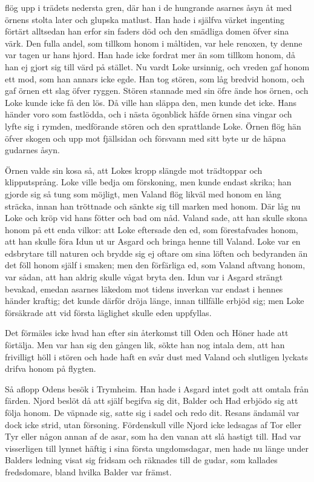 flög upp i trädets nedersta gren, där han i de hungrande asarnes åsyn åt
med örnens stolta later och glupska matlust. Han hade i själfva värket
ingenting förtärt alltsedan han erfor sin faders död och den smädliga
domen öfver sina värk. Den fulla andel, som tillkom honom i måltiden,
var hele renoxen, ty denne var tagen ur hans hjord. Han hade icke
fordrat mer än som tillkom honom, då han ej gjort sig till värd på
stället. Nu vardt Loke ursinnig, och vreden gaf honom ett mod, som han
annars icke egde. Han tog stören, som låg bredvid honom, och gaf örnen
ett slag öfver ryggen. Stören stannade med sin öfre ände hos örnen, och
Loke kunde icke få den lös. Då ville han släppa den, men kunde det icke.
Hans händer voro som fastlödda, och i nästa ögonblick häfde örnen sina
vingar och lyfte sig i rymden, medförande stören och den sprattlande
Loke. Örnen flög hän öfver skogen och upp mot fjällsidan och försvann
med sitt byte ur de häpna gudarnes åsyn.

Örnen valde sin kosa så, att Lokes kropp slängde mot trädtoppar och
klipputsprång. Loke ville bedja om förskoning, men kunde endast skrika;
han gjorde sig så tung som möjligt, men Valand flög likväl med honom en
lång sträcka, innan han tröttnade och sänkte sig till marken med honom.
Där låg nu Loke och kröp vid hans fötter och bad om nåd. Valand sade,
att han skulle skona honom på ett enda vilkor: att Loke eftersade den
ed, som förestafvades honom, att han skulle föra Idun ut ur Asgard och
bringa henne till Valand. Loke var en edsbrytare till naturen och brydde
sig ej oftare om sina löften och bedyranden än det föll honom själf i
smaken; men den förfärliga ed, som Valand aftvang honom, var sådan, att
han aldrig skulle vågat bryta den. Idun var i Asgard strängt bevakad,
emedan asarnes läkedom mot tidens inverkan var endast i hennes händer
kraftig; det kunde därför dröja länge, innan tillfälle erbjöd sig; men
Loke försäkrade att vid första läglighet skulle eden uppfyllas.

Det förmäles icke hvad han efter sin återkomst till Oden och Höner hade
att förtälja. Men var han sig den gången
lik, sökte han nog intala dem, att han frivilligt höll i stören och hade
haft en svår dust med Valand och slutligen lyckats drifva honom på
flygten.

Så aflopp Odens besök i Trymheim. Han hade i Asgard intet godt att
omtala från färden. Njord beslöt då att själf begifva sig dit, Balder
och Had erbjödo sig att följa honom. De väpnade sig, satte sig i sadel
och redo dit. Resans ändamål var dock icke strid, utan försoning.
Fördenskull ville Njord icke ledsagas af Tor eller Tyr eller någon annan
af de asar, som ha den vanan att slå hastigt till. Had var visserligen
till lynnet häftig i sina första ungdomsdagar, men hade nu länge under
Balders ledning visat sig fridsam och räknades till de gudar, som
kallades fredsdomare, bland hvilka Balder var främst.


